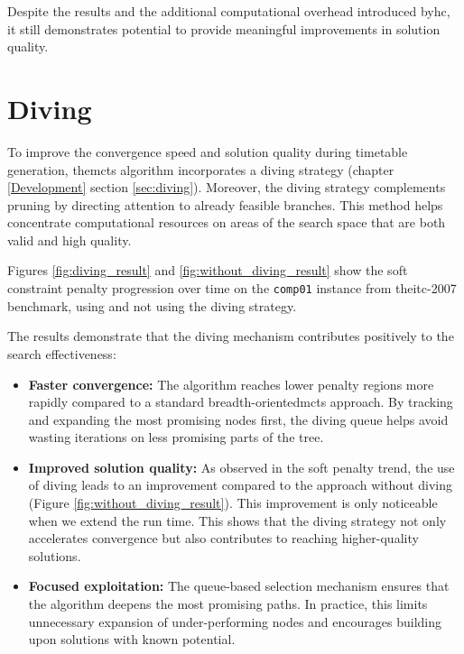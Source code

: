 Despite the results and the additional computational overhead introduced by\ac{hc}, it still demonstrates potential to provide meaningful improvements in solution quality.
   
\section{Diving}

To improve the convergence speed and solution quality during timetable generation, the\ac{mcts} algorithm incorporates a diving strategy (chapter \ref{Development} section \ref{sec:diving}). Moreover, the diving strategy complements pruning by directing attention to already feasible branches. This method helps concentrate computational resources on areas of the search space that are both valid and high quality.

Figures \ref{fig:diving_result} and \ref{fig:without_diving_result} show the soft constraint penalty progression over time on the \texttt{comp01} instance from the\ac{itc-2007} benchmark, using and not using the diving strategy.

The results demonstrate that the diving mechanism contributes positively to the search effectiveness:

\begin{itemize}
\item \textbf{Faster convergence:} The algorithm reaches lower penalty regions more rapidly compared to a standard breadth-oriented\ac{mcts} approach. By tracking and expanding the most promising nodes first, the diving queue helps avoid wasting iterations on less promising parts of the tree.

\item \textbf{Improved solution quality:} As observed in the soft penalty trend, the use of diving leads to an improvement compared to the approach without diving (Figure \ref{fig:without_diving_result}). This improvement is only noticeable when we extend the run time. This shows that the diving strategy not only accelerates convergence but also contributes to reaching higher-quality solutions.

\item \textbf{Focused exploitation:} The queue-based selection mechanism ensures that the algorithm deepens the most promising paths. In practice, this limits unnecessary expansion of under-performing nodes and encourages building upon solutions with known potential.
\end{itemize}

